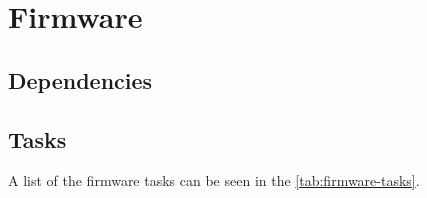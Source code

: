 %
%
%
%
%

%
%
%
%
%
%

\chapter{Firmware} \label{ch:firmware}

\section{Dependencies}

\section{Tasks}

A list of the firmware tasks can be seen in the \autoref{tab:firmware-tasks}.

